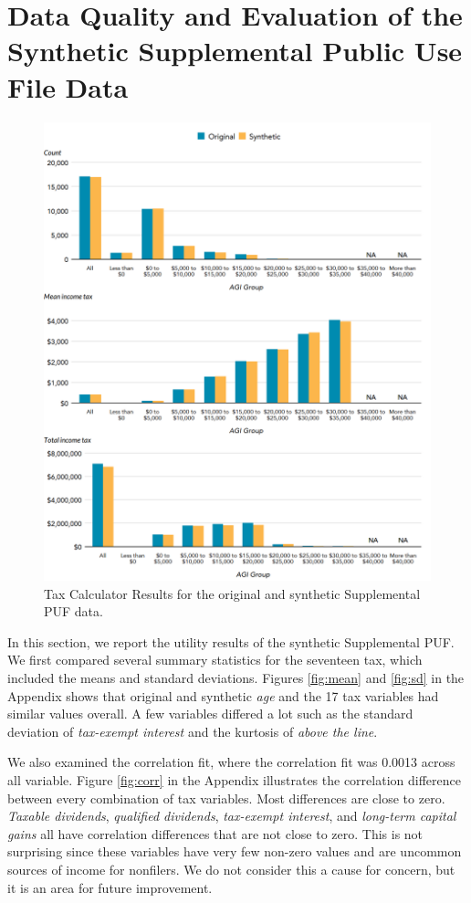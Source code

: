 \documentclass[11pt,runningheads,oribibl]{llncs}
\begin{document}
\section{Data Quality and Evaluation of the Synthetic Supplemental Public Use File Data}\label{sec:results}

\begin{figure}
    \includegraphics[width=\textwidth]{figures/tax-calulator-1.png}
    \caption{Tax Calculator Results for the original and synthetic Supplemental PUF data.} \label{fig:tax}
\end{figure}

In this section, we report the utility results of the synthetic Supplemental PUF. We first compared several summary statistics for the seventeen tax, which included the means and standard deviations. Figures \ref{fig:mean} and \ref{fig:sd} in the Appendix shows that original and synthetic \textit{age} and the 17 tax variables had similar values overall. A few variables differed a lot such as the standard deviation of \textit{tax-exempt interest} and the kurtosis of \textit{above the line}.

We also examined the correlation fit, where the correlation fit was 0.0013 across all variable. Figure \ref{fig:corr} in the Appendix illustrates the correlation difference between every combination of tax variables. Most differences are close to zero. \textit{Taxable dividends}, \textit{qualified dividends}, \textit{tax-exempt interest}, and \textit{long-term capital gains} all have correlation differences that are not close to zero. This is not surprising since these variables have very few non-zero values and are uncommon sources of income for nonfilers. We do not consider this a cause for concern, but it is an area for future improvement.
\end{document}
